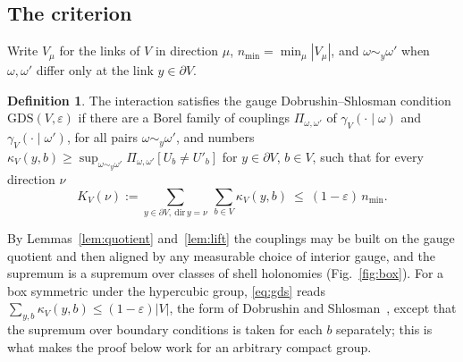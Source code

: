 \documentclass[aps,prd,twocolumn,superscriptaddress,nofootinbib,longbibliography,floatfix,amsmath,amssymb,10pt]{revtex4-2}
\theoremstyle{definition}
\newtheorem{definition}[theorem]{Definition}
\theoremstyle{remark}
\begin{document}
\subsection{The criterion}

Write $V_\mu$ for the links of $V$ in direction $\mu$, $n_{\min}=\min_\mu
|V_\mu|$, and $\omega\sim_y\omega'$ when $\omega,\omega'$ differ only at the
link $y\in\partial V$.

\begin{definition}\label{def:gds}
The interaction satisfies the gauge Dobrushin--Shlosman condition
$\mathrm{GDS}(V,\varepsilon)$ if there are a Borel family of couplings
$\Pi_{\omega,\omega'}$ of $\gamma_V(\cdot\mid\omega)$ and
$\gamma_V(\cdot\mid\omega')$, for all pairs $\omega\sim_y\omega'$, and numbers
$\kappa_V(y,b)\ge\sup_{\omega\sim_y\omega'}\Pi_{\omega,\omega'}[U_b\ne
U'_b]$ for $y\in\partial V$, $b\in V$, such that for every direction $\nu$
\begin{equation}\label{eq:gds}
K_V(\nu):=\sum_{y\in\partial V,\ \mathrm{dir}\,y=\nu}\ \sum_{b\in V}
\kappa_V(y,b)\ \le\ (1-\varepsilon)\,n_{\min}.
\end{equation}
\end{definition}

By Lemmas~\ref{lem:quotient} and~\ref{lem:lift} the couplings may be built on
the gauge quotient and then aligned by any measurable choice of interior
gauge, and the supremum is a supremum over classes of shell holonomies
(Fig.~\ref{fig:box}). For a box symmetric under the hypercubic group,
\eqref{eq:gds} reads $\sum_{y,b}\kappa_V(y,b)\le(1-\varepsilon)|V|$, the form
of Dobrushin and Shlosman~\cite{DS85}, except that the supremum over boundary
conditions is taken for each $b$ separately; this is what makes the proof
below work for an arbitrary compact group.
\end{document}
